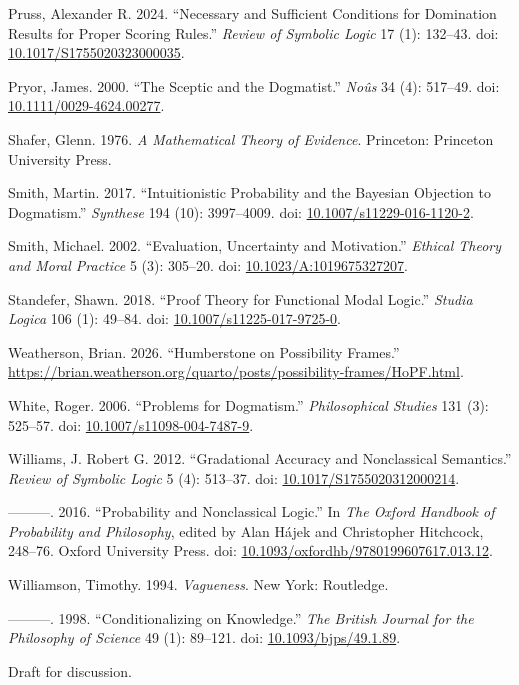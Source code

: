 \documentclass[
  11pt,
  letterpaper,
  DIV=11,
  numbers=noendperiod,
  twoside]{scrartcl}
\newlength{\cslhangindent}
\newenvironment{CSLReferences}[2] %
 {\begin{list}{}{%
  \setlength{\itemindent}{0pt}
  \setlength{\leftmargin}{0pt}
  \setlength{\parsep}{0pt}
  \ifodd #1
   \setlength{\leftmargin}{\cslhangindent}
   \setlength{\itemindent}{-1\cslhangindent}
  \fi
  \setlength{\itemsep}{#2\baselineskip}}}
 {\end{list}}
\begin{document}
\begin{CSLReferences}{1}{0}
Pruss, Alexander R. 2024. {``Necessary and Sufficient Conditions for
Domination Results for Proper Scoring Rules.''} \emph{Review of Symbolic
Logic} 17 (1): 132--43. doi:
\href{https://doi.org/10.1017/S1755020323000035}{10.1017/S1755020323000035}.

Pryor, James. 2000. {``The Sceptic and the Dogmatist.''} \emph{No{û}s}
34 (4): 517--49. doi:
\href{https://doi.org/10.1111/0029-4624.00277}{10.1111/0029-4624.00277}.

Shafer, Glenn. 1976. \emph{A Mathematical Theory of Evidence}.
Princeton: Princeton University Press.

Smith, Martin. 2017. {``Intuitionistic Probability and the {B}ayesian
Objection to Dogmatism.''} \emph{Synthese} 194 (10): 3997--4009. doi:
\href{https://doi.org/10.1007/s11229-016-1120-2}{10.1007/s11229-016-1120-2}.

Smith, Michael. 2002. {``Evaluation, Uncertainty and Motivation.''}
\emph{Ethical Theory and Moral Practice} 5 (3): 305--20. doi:
\href{https://doi.org/10.1023/A:1019675327207}{10.1023/A:1019675327207}.

Standefer, Shawn. 2018. {``Proof Theory for Functional Modal Logic.''}
\emph{Studia Logica} 106 (1): 49--84. doi:
\href{https://doi.org/10.1007/s11225-017-9725-0}{10.1007/s11225-017-9725-0}.

Weatherson, Brian. 2026. {``Humberstone on Possibility Frames.''}
\url{https://brian.weatherson.org/quarto/posts/possibility-frames/HoPF.html}.

White, Roger. 2006. {``Problems for Dogmatism.''} \emph{Philosophical
Studies} 131 (3): 525--57. doi:
\href{https://doi.org/10.1007/s11098-004-7487-9}{10.1007/s11098-004-7487-9}.

Williams, J. Robert G. 2012. {``Gradational Accuracy and Nonclassical
Semantics.''} \emph{Review of Symbolic Logic} 5 (4): 513--37. doi:
\href{https://doi.org/10.1017/S1755020312000214}{10.1017/S1755020312000214}.

---------. 2016. {``Probability and Nonclassical Logic.''} In \emph{The
Oxford Handbook of Probability and Philosophy}, edited by Alan Hájek and
Christopher Hitchcock, 248--76. Oxford University Press. doi:
\href{https://doi.org/10.1093/oxfordhb/9780199607617.013.12}{10.1093/oxfordhb/9780199607617.013.12}.

Williamson, Timothy. 1994. \emph{{Vagueness}}. New York: Routledge.

---------. 1998. {``Conditionalizing on Knowledge.''} \emph{The British
Journal for the Philosophy of Science} 49 (1): 89--121. doi:
\href{https://doi.org/10.1093/bjps/49.1.89}{10.1093/bjps/49.1.89}.

\end{CSLReferences}



\noindent Draft for discussion.
\end{document}
